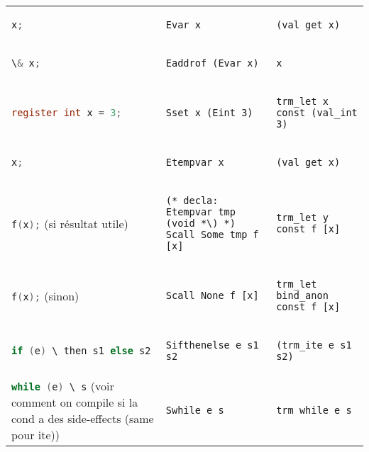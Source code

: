 \documentclass[class=scrartcl,border={0cm 1.5cm 1cm -0.5cm},multi={tabular}]{standalone}
\theoremstyle{break}
\newcommand{\clst}[1]{\lstinline[language=C]!#1!}
\begin{document}
\begin{tabular}{p{6cm}p{10cm}p{10cm}}
  \clst{x;} &
\begin{lstlisting}
Evar x
\end{lstlisting} &
\begin{lstlisting}
(val_get x)
\end{lstlisting} \\
  \clst{\& x;} &
\begin{lstlisting}
Eaddrof (Evar x)
\end{lstlisting} &
\begin{lstlisting}
x
\end{lstlisting} \\
  \midrule
  \clst{register int x = 3;} &
\begin{lstlisting}
Sset x (Eint 3)
\end{lstlisting} &
\begin{lstlisting}
trm_let x const (val_int 3)
\end{lstlisting} \\
\clst{x;} &
\begin{lstlisting}
Etempvar x
\end{lstlisting} &
\begin{lstlisting}
(val_get x)
\end{lstlisting} \\
  \midrule
\clst{f(x);} (si résultat utile) &
\begin{lstlisting}
(* decla: Etempvar tmp (void *\) *)
Scall Some tmp f [x]
\end{lstlisting} &
\begin{lstlisting}
trm_let y const f [x]
\end{lstlisting} \\
  \midrule
\clst{f(x);} (sinon) &
\begin{lstlisting}
Scall None f [x]
\end{lstlisting} &
\begin{lstlisting}
trm_let bind_anon const f [x]
\end{lstlisting} \\
  \midrule
\clst{if (e) \ then s1 else s2} &
\begin{lstlisting}
Sifthenelse e s1 s2
\end{lstlisting} &
\begin{lstlisting}
(trm_ite e s1 s2)
\end{lstlisting} \\
  \midrule
\clst{while (e) \ s} (voir comment on compile si la cond a des
  side-effects (same pour ite)) &
\begin{lstlisting}
Swhile e s
\end{lstlisting} &
\begin{lstlisting}
trm_while e s
\end{lstlisting} \\
  \bottomrule
\end{tabular}
\end{document}
